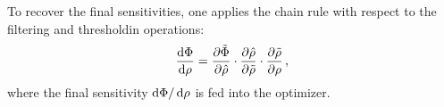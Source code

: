     To recover the final sensitivities, one applies the chain rule with respect to the filtering and thresholdin operations:
    \begin{equation}
        \frac{\mathop{}\!\text{d} \Phi}{\mathop{}\!\text{d} \rho} = \frac{\partial \tilde{\Phi}}{\partial \hat{\rho}} \cdot \frac{\partial \hat{\rho}}{\partial \tilde{\rho}} \cdot \frac{\partial \tilde{\rho}}{\partial \rho}\,,
    \end{equation}
    where the final sensitivity $\mathop{}\!\text{d} \Phi/\mathop{}\!\text{d} \rho$ is fed into the optimizer.






